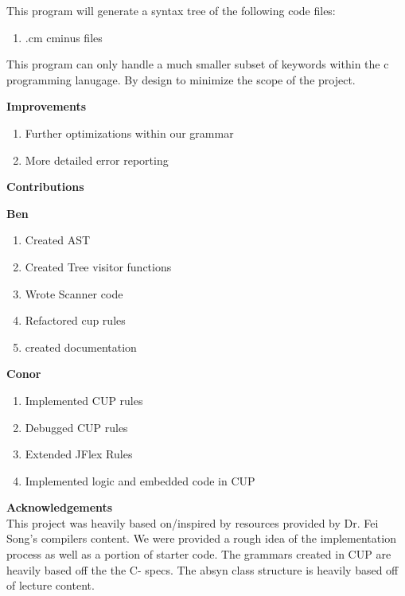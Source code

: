 \documentclass[12pt]{extarticle}
\begin{document}
This program will generate a syntax tree of the following code files:
\begin{enumerate}
    \item .cm cminus files
\end{enumerate}

This program can only handle a much smaller subset of keywords within the c programming lanugage. By design to minimize the scope of the project.

\textbf{Improvements}

\begin{enumerate}
    \item Further optimizations within our grammar
    \item More detailed error reporting
\end{enumerate}
\textbf{Contributions}

\begin{multicols}{2}
\textbf{Ben}
\begin{enumerate}
    \item Created AST
    \item Created Tree visitor functions
    \item Wrote Scanner code
    \item Refactored cup rules
    \item created documentation
\end{enumerate}
\columnbreak
\textbf{Conor}
\begin{enumerate}
    \item Implemented CUP rules
    \item Debugged CUP rules
    \item Extended JFlex Rules
    \item Implemented logic and embedded code in CUP
\end{enumerate}
\end{multicols}




\vspace{0.5cm}

\textbf{Acknowledgements} \\
This project was heavily based on/inspired by resources provided by Dr. Fei Song's compilers content. We were provided a rough idea of the implementation process as well as a portion of starter code. The grammars created in CUP are heavily based off the the C- specs. The absyn class structure is heavily based off of lecture content.
\end{document}
